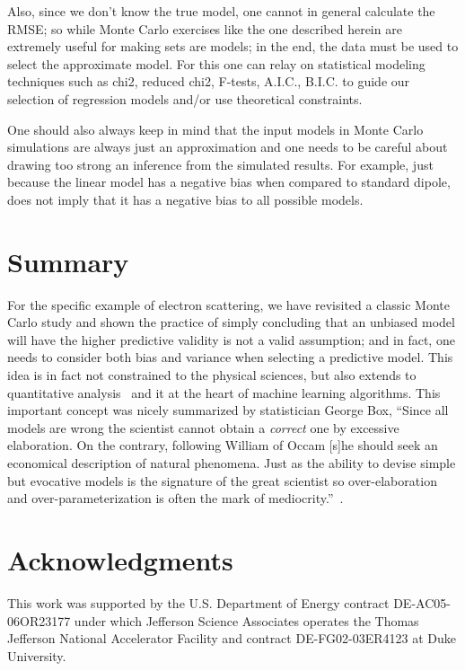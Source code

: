\documentclass[10pt,aps,prc,twocolumn]{revtex4-1}
\begin{document}
Also, since we don't know the true model, one cannot in general calculate the RMSE; so while Monte Carlo exercises 
like the one described herein are extremely useful for making sets are models; in the end, the data must be used 
to select the approximate model. 
For this one can relay on statistical modeling techniques such as chi2, reduced chi2, F-tests, A.I.C., B.I.C. 
to guide our selection of regression models and/or use theoretical constraints.

One should also always keep in mind that the input models in Monte Carlo simulations are always just an approximation
and one needs to be careful about drawing too strong an inference from the simulated results. 
For example, just because the linear model has a negative bias when compared to standard dipole, does not imply that 
it has a negative bias to all possible models.


\section{Summary}

For the specific example of electron scattering, we have revisited a classic Monte Carlo study and shown
the practice of simply concluding that an unbiased model will have the higher predictive validity 
is not a valid assumption; and in fact, one needs to consider both bias and variance when selecting
a predictive model.   This idea is in fact not constrained to the physical sciences, but also extends 
to quantitative analysis~\cite{Brighton:2015} and it at the heart of machine learning algorithms.
This important concept was nicely summarized by statistician George Box, ``Since all models 
are wrong the scientist cannot obtain a {\it{correct}} one
by excessive elaboration.  On the contrary, following William of Occam [s]he should seek an
economical description of natural phenomena. Just as the ability to devise simple 
but evocative models is the signature of the
great scientist so over-elaboration and over-parameterization is often
the mark of mediocrity.''~\cite{Box76}.


\section{Acknowledgments}

This work was supported by the U.S.  Department of Energy contract DE-AC05-06OR23177
under which Jefferson Science Associates operates the Thomas Jefferson National 
Accelerator Facility and contract DE-FG02-03ER4123 at Duke University.


\end{document}
